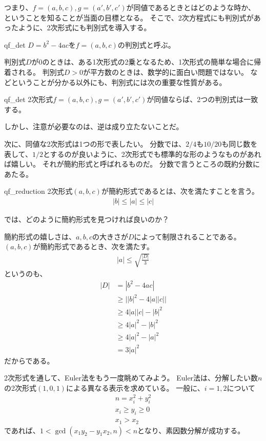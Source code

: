 つまり、$f=(a,b,c),g=(a',b',c')$が同値であるときとはどのような時か、ということを知ることが当面の目標となる。
そこで、2次方程式にも判別式があったように、2次形式にも判別式を導入する。

\begin{Defi}{}{qf_det}
$D=b^2-4ac$を$f=(a,b,c)$の判別式と呼ぶ。
\end{Defi}

判別式$D$が$0$のときは、ある1次形式の2乗となるため、1次形式の簡単な場合に帰着される。
判別式$D>0$が平方数のときは、数学的に面白い問題ではない。
などということが分かる以外にも、判別式には次の重要な性質がある。

\begin{Prop}{}{qf_det}
2次形式$f=(a,b,c),g=(a',b',c')$が同値ならば、2つの判別式は一致する。
\end{Prop}

しかし、注意が必要なのは、逆は成り立たないことだ。

次に、同値な2次形式は1つの形で表したい。
分数では、$2/4$も$10/20$も同じ数を表して、$1/2$とするのが良いように、2次形式でも標準的な形のようなものがあれば嬉しい。
それが簡約形式と呼ばれるものだ。
分数で言うところの既約分数にあたる。

\begin{Defi}{}{qf_reduction}
2次形式$(a,b,c)$が簡約形式であるとは、次を満たすことを言う。
\begin{align*}
|b| \le |a| \le |c|
\end{align*}
\end{Defi}

では、どのように簡約形式を見つければ良いのか？　


簡約形式の嬉しさは、$a,b,c$の大きさが$D$によって制限されることである。
$(a,b,c)$が簡約形式であるとき、次を満たす。
\begin{align*}
|a| \le \sqrt{\frac{|D|}{3}}
\end{align*}
というのも、
\begin{align*}
|D| &= |b^2 - 4ac|\\
&\ge \big| |b|^2 - 4|a||c| \big|\\
&\ge 4|a||c| - |b|^2\\
&\ge 4|a|^2 - |b|^2\\
&\ge 4|a|^2 - |a|^2\\
&=3|a|^2
\end{align*}
だからである。

2次形式を通して、Euler法をもう一度眺めてみよう。
Euler法は、分解したい数$n$の2次形式$(1,0,1)$による異なる表示を求めている。
一般に、$i=1,2$について
\begin{align*}
n = x_i^2 + y_i^2\\
x_i \ge y_i \ge 0\\
x_1 > x_2
\end{align*}
であれば、$1<\gcd(x_1y_2 - y_1x_2, n) < n$となり、素因数分解が成功する。

